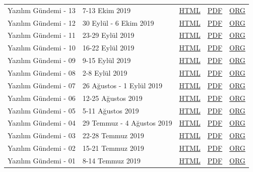 \documentclass[11pt]{article}
\begin{document}
\begin{center}
\begin{tabular}{lllll}
Yazılım Gündemi - 13 & 7-13 Ekim 2019 & \href{arsiv/2019/13/yazilim-gundemi-13.html}{HTML} & \href{arsiv/2019/13/yazilim-gundemi-13.pdf}{PDF} & \href{arsiv/2019/13/yazilim-gundemi-13.pdf}{ORG}\\
Yazılım Gündemi - 12 & 30 Eylül - 6 Ekim 2019 & \href{arsiv/2019/12/yazilim-gundemi-12.html}{HTML} & \href{arsiv/2019/12/yazilim-gundemi-12.pdf}{PDF} & \href{arsiv/2019/12/yazilim-gundemi-12.pdf}{ORG}\\
Yazılım Gündemi - 11 & 23-29 Eylül 2019 & \href{arsiv/2019/11/yazilim-gundemi-11.html}{HTML} & \href{arsiv/2019/11/yazilim-gundemi-11.pdf}{PDF} & \href{arsiv/2019/11/yazilim-gundemi-11.pdf}{ORG}\\
Yazılım Gündemi - 10 & 16-22 Eylül 2019 & \href{arsiv/2019/10/yazilim-gundemi-10.html}{HTML} & \href{arsiv/2019/10/yazilim-gundemi-10.pdf}{PDF} & \href{arsiv/2019/10/yazilim-gundemi-10.pdf}{ORG}\\
Yazılım Gündemi - 09 & 9-15 Eylül 2019 & \href{arsiv/2019/09/yazilim-gundemi-09.html}{HTML} & \href{arsiv/2019/09/yazilim-gundemi-09.pdf}{PDF} & \href{arsiv/2019/09/yazilim-gundemi-09.pdf}{ORG}\\
Yazılım Gündemi - 08 & 2-8 Eylül 2019 & \href{arsiv/2019/08/yazilim-gundemi-08.html}{HTML} & \href{arsiv/2019/08/yazilim-gundemi-08.pdf}{PDF} & \href{arsiv/2019/08/yazilim-gundemi-08.pdf}{ORG}\\
Yazılım Gündemi - 07 & 26 Ağustos - 1 Eylül 2019 & \href{arsiv/2019/07/yazilim-gundemi-07.html}{HTML} & \href{arsiv/2019/07/yazilim-gundemi-07.pdf}{PDF} & \href{arsiv/2019/07/yazilim-gundemi-07.pdf}{ORG}\\
Yazılım Gündemi - 06 & 12-25 Ağustos 2019 & \href{arsiv/2019/06/yazilim-gundemi-06.html}{HTML} & \href{arsiv/2019/06/yazilim-gundemi-06.pdf}{PDF} & \href{arsiv/2019/06/yazilim-gundemi-06.pdf}{ORG}\\
Yazılım Gündemi - 05 & 5-11 Ağustos 2019 & \href{arsiv/2019/05/yazilim-gundemi-05.html}{HTML} & \href{arsiv/2019/05/yazilim-gundemi-05.pdf}{PDF} & \href{arsiv/2019/05/yazilim-gundemi-05.pdf}{ORG}\\
Yazılım Gündemi - 04 & 29 Temmuz - 4 Ağustos 2019 & \href{arsiv/2019/04/yazilim-gundemi-04.html}{HTML} & \href{arsiv/2019/04/yazilim-gundemi-04.pdf}{PDF} & \href{arsiv/2019/04/yazilim-gundemi-04.pdf}{ORG}\\
Yazılım Gündemi - 03 & 22-28 Temmuz 2019 & \href{arsiv/2019/03/yazilim-gundemi-03.html}{HTML} & \href{arsiv/2019/03/yazilim-gundemi-03.pdf}{PDF} & \href{arsiv/2019/03/yazilim-gundemi-03.pdf}{ORG}\\
Yazılım Gündemi - 02 & 15-21 Temmuz 2019 & \href{arsiv/2019/02/yazilim-gundemi-02.html}{HTML} & \href{arsiv/2019/02/yazilim-gundemi-02.pdf}{PDF} & \href{arsiv/2019/02/yazilim-gundemi-02.pdf}{ORG}\\
Yazılım Gündemi - 01 & 8-14 Temmuz 2019 & \href{arsiv/2019/01/yazilim-gundemi-01.html}{HTML} & \href{arsiv/2019/01/yazilim-gundemi-01.pdf}{PDF} & \href{arsiv/2019/01/yazilim-gundemi-01.pdf}{ORG}\\
\hline
\end{tabular}
\end{center}
\end{document}
